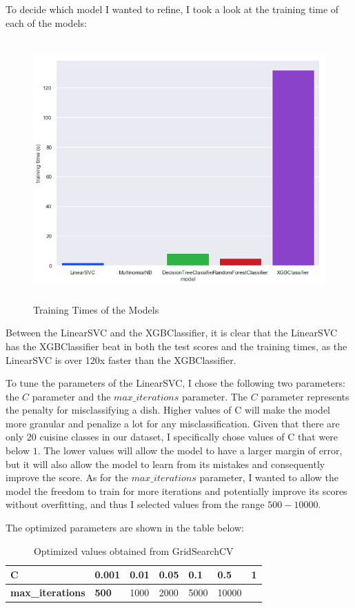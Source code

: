 \documentclass[12pt]{article}
\begin{document}
To decide which model I wanted to refine, I took a look at the training time of each of the models:

\begin{figure}[!h]
\includegraphics[width=\textwidth, height=10cm]{training_times.png}
\caption{Training Times of the Models}
\label{fig: training-times}
\end{figure}

\noindent
Between the LinearSVC and the XGBClassifier, it is clear that the LinearSVC has the XGBClassifier beat in both the test scores and the training times, as the LinearSVC is over 120x faster than the XGBClassifier. 

To tune the parameters of the LinearSVC, I chose the following two parameters: the $C$ parameter and the $max\_iterations$ parameter. The $C$ parameter represents the penalty for misclassifying a dish. Higher values of C will make the model more granular and penalize a lot for any misclassification. Given that there are only 20 cuisine classes in our dataset, I specifically chose values of C that were below $1$. The lower values will allow the model to have a larger margin of error, but it will also allow the model to learn from its mistakes and consequently improve the score. As for the $max\_iterations$ parameter, I wanted to allow the model the freedom to train for more iterations and potentially improve its scores without overfitting, and thus I selected values from the range $500-10000$.

The optimized parameters are shown in the table below:

\begin{table}[H]
\centering
\begin{tabular}{|l|l|l|l|l|l|l|}
\hline
\textbf{C}               & 0.001        & 0.01 & 0.05 & 0.1  & \textbf{0.5} & 1 \\ \hline
\textbf{max\_iterations} & \textbf{500} & 1000 & 2000 & 5000 & 10000        &   \\ \hline
\end{tabular}
\caption{Optimized values obtained from GridSearchCV}
\end{table}
\end{document}
